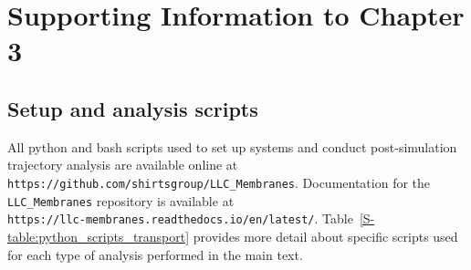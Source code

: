 \chapter{Supporting Information to Chapter 3}\label{SI:ch3}

  \section{Setup and analysis scripts}\label{S-section:python_scripts_transport}

  All python and bash scripts used to set up systems and conduct post-simulation trajectory
  analysis are available online at \texttt{https://github.com/shirtsgroup/LLC\_Membranes}.
  Documentation for the \texttt{LLC\_Membranes} repository is available at \\
  \texttt{https://llc-membranes.readthedocs.io/en/latest/}. Table~\ref{S-table:python_scripts_transport}
  provides more detail about specific scripts used for each type of analysis performed in
  the main text.
  
